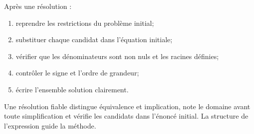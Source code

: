 Après une résolution :
\begin{enumerate}
\item reprendre les restrictions du problème initial;
\item substituer chaque candidat dans l'équation initiale;
\item vérifier que les dénominateurs sont non nuls et les racines définies;
\item contrôler le signe et l'ordre de grandeur;
\item écrire l'ensemble solution clairement.
\end{enumerate}

\begin{summarybox}
Une résolution fiable distingue équivalence et implication, note le domaine avant toute simplification et vérifie les candidats dans l'énoncé initial. La structure de l'expression guide la méthode.
\end{summarybox}

